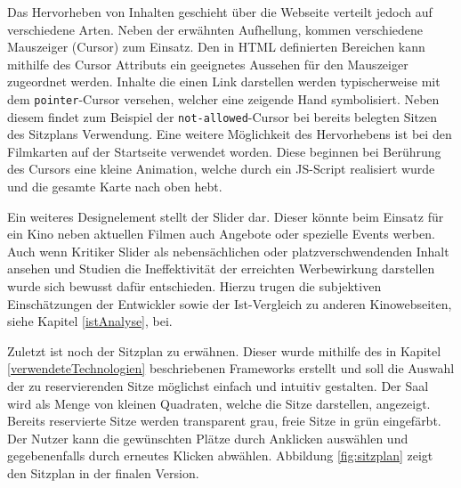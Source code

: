 	
	Das Hervorheben von Inhalten geschieht über die Webseite verteilt jedoch auf verschiedene Arten. Neben der erwähnten Aufhellung, kommen verschiedene Mauszeiger (Cursor) zum Einsatz. Den in \ac{HTML} definierten Bereichen kann mithilfe des Cursor Attributs ein geeignetes Aussehen für den Mauszeiger zugeordnet werden. Inhalte die einen Link darstellen werden typischerweise mit dem \texttt{pointer}-Cursor versehen, welcher eine zeigende Hand symbolisiert. Neben diesem findet zum Beispiel der \texttt{not-allowed}-Cursor bei bereits belegten Sitzen des Sitzplans Verwendung. Eine weitere Möglichkeit des Hervorhebens ist bei den Filmkarten auf der Startseite verwendet worden. Diese beginnen bei Berührung des Cursors eine kleine Animation, welche durch ein JS-Script realisiert wurde und die gesamte Karte nach oben hebt. 
	
	Ein weiteres Designelement stellt der Slider dar. Dieser könnte beim Einsatz für ein Kino neben aktuellen Filmen auch Angebote oder spezielle Events werben. Auch wenn Kritiker Slider als nebensächlichen oder platzverschwendenden Inhalt ansehen und Studien die Ineffektivität der erreichten Werbewirkung darstellen\autocite[Vgl.][]{Webdesign} wurde sich bewusst dafür entschieden. Hierzu trugen die subjektiven Einschätzungen der Entwickler sowie der Ist-Vergleich zu anderen Kinowebseiten, siehe Kapitel \vref{istAnalyse}, bei.
	
	Zuletzt ist noch der Sitzplan zu erwähnen. Dieser wurde mithilfe des in Kapitel \vref{verwendeteTechnologien}
	beschriebenen Frameworks erstellt und soll die Auswahl der zu reservierenden Sitze möglichst einfach und intuitiv gestalten. Der Saal wird als Menge von kleinen Quadraten, welche die Sitze darstellen, angezeigt. Bereits reservierte Sitze werden transparent grau, freie Sitze in grün eingefärbt. Der Nutzer kann die gewünschten Plätze durch Anklicken auswählen und gegebenenfalls durch erneutes Klicken abwählen. Abbildung \vref{fig:sitzplan} zeigt den Sitzplan in der finalen Version.
	
